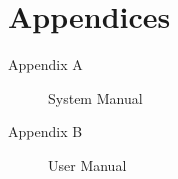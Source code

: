 \section*{Appendices}
\thispagestyle{empty}

\begin{description}
	\item[Appendix A] System Manual
	\item[Appendix B] User Manual
\end{description}